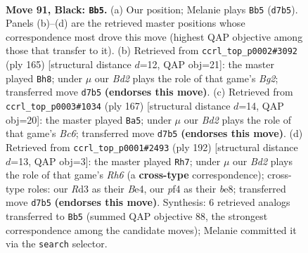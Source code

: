 \documentclass[11pt]{article}
\begin{document}
\clearpage

\begin{figure}[p]\centering
\begin{subfigure}{0.46\textwidth}\centering
\resizebox{\linewidth}{!}{%
\newchessgame
\chessboard[
  setfen={3R4/3b1k2/8/5p2/5P2/3r4/7K/8 b - - 6 91},
  showmover=false,
  pgfstyle=straightmove, color=movearrow, markmove={d7-b5}
]}
\caption{}
\end{subfigure}\hfill
\begin{subfigure}{0.46\textwidth}\centering
\resizebox{\linewidth}{!}{%
\newchessgame
\chessboard[
  setfen={8/6b1/6R1/3k1P2/8/2p5/4K3/8 b - - 9 83},
  showmover=false,
  pgfstyle=straightmove, color=movearrow, markmove={g7-h8}
]}
\caption{}
\end{subfigure}
\\[4pt]
\begin{subfigure}{0.46\textwidth}\centering
\resizebox{\linewidth}{!}{%
\newchessgame
\chessboard[
  setfen={8/4k3/8/8/4P3/1Rb5/3pK3/8 b - - 43 84},
  showmover=false,
  pgfstyle=straightmove, color=movearrow, markmove={c3-a5}
]}
\caption{}
\end{subfigure}\hfill
\begin{subfigure}{0.46\textwidth}\centering
\resizebox{\linewidth}{!}{%
\newchessgame
\chessboard[
  setfen={4b3/r7/7R/4k3/4B2P/8/4K3/8 w - - 1 97},
  showmover=false,
  pgfstyle=straightmove, color=movearrow, markmove={h6-h7}
]}
\caption{}
\end{subfigure}
\caption{\textbf{Move 91, Black: \texttt{Bb5}.} (a) Our position; Melanie plays \texttt{Bb5} (\texttt{d7b5}). Panels (b)--(d) are the retrieved master positions whose correspondence most drove this move (highest QAP objective among those that transfer to it). (b) Retrieved from \texttt{ccrl\_top\_p0002\#3092} (ply 165) [structural distance $d$=12, QAP obj=21]: the master played \texttt{Bh8}; under $\mu$ our \emph{Bd2} plays the role of that game's \emph{Bg2}; transferred move \texttt{d7b5} \textbf{(endorses this move)}. (c) Retrieved from \texttt{ccrl\_top\_p0003\#1034} (ply 167) [structural distance $d$=14, QAP obj=20]: the master played \texttt{Ba5}; under $\mu$ our \emph{Bd2} plays the role of that game's \emph{Bc6}; transferred move \texttt{d7b5} \textbf{(endorses this move)}. (d) Retrieved from \texttt{ccrl\_top\_p0001\#2493} (ply 192) [structural distance $d$=13, QAP obj=3]: the master played \texttt{Rh7}; under $\mu$ our \emph{Bd2} plays the role of that game's \emph{Rh6} (a \textbf{cross-type} correspondence); cross-type roles: our \emph{R}d3 as their \emph{B}e4, our \emph{p}f4 as their \emph{b}e8; transferred move \texttt{d7b5} \textbf{(endorses this move)}. Synthesis: 6 retrieved analogs transferred to \texttt{Bb5} (summed QAP objective 88, the strongest correspondence among the candidate moves); Melanie committed it via the \texttt{search} selector.}
\label{fig:thought-m181}
\end{figure}
\end{document}
